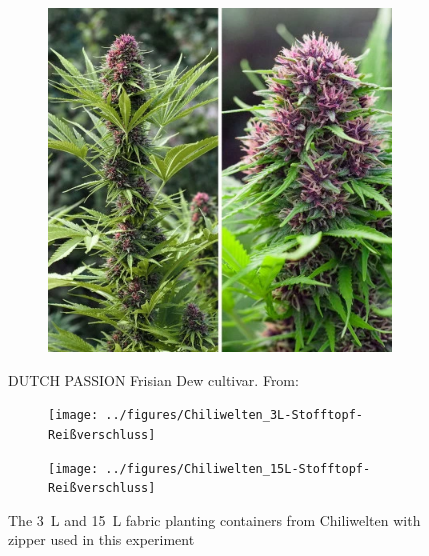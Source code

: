 \begin{figure}[H]
\begin{minipage}[t]{0.48\textwidth}
\begin{subfigure}[t]{.48\textwidth}
            \label{fig:cannabis_frisian-dew_1}
        \end{subfigure}
        \begin{subfigure}[t]{.48\textwidth}
            \includegraphics[width=\linewidth]{../figures/DUTCH-PASSION_Frisian-Dew_2}
            \label{fig:cannabis_frisian-dew_2}
        \end{subfigure}
        \caption[DUTCH PASSION Frisian Dew]{DUTCH PASSION Frisian Dew cultivar. From: }
        \label{fig:cannabis_frisian-dew}
    \end{minipage}
\end{figure}

\begin{figure}[H]
    \begin{subfigure}[t]{.48\textwidth}
        \texttt{[image: ../figures/Chiliwelten\_3L-Stofftopf-Reißverschluss]}
        \label{fig:planting-container-3L}
    \end{subfigure}
    \hfill
    \begin{subfigure}[t]{.48\textwidth}
        \texttt{[image: ../figures/Chiliwelten\_15L-Stofftopf-Reißverschluss]}
        \label{fig:planting-container-15L}
    \end{subfigure}
    \caption[Planting containers used in this experiment]{The \qty[mode=text]{3}{\L} and \qty[mode=text]{15}{\L} fabric planting containers from Chiliwelten with zipper used in this experiment}
    \label{fig:planting-containers}
\end{figure}

